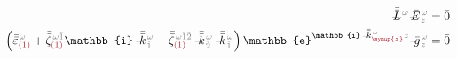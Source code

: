 \begin{subequations}
\begin{align}
	\xint{\mathcolor{gray}{-}}{32}{\bar{\bar{L}}}^{\;\! \mathcolor{gray}{\omega}} \xint{\mathcolor{gray}{-}}{295}{\bar{E}}^{\;\!\mathcolor{gray}{\omega}}_{\;\! \mathcolor{gray}{z}}
	&= \bar{0} \label{eq:nonlinear(2)-wave_wkrho-simplify6-L} \\
	\left( \bar{\bar{\varepsilon}}^{\;\! \mathcolor{gray}{\omega}}_{\textcolor{Maroon}{(1)}} + \bar{\bar{\zeta}}^{\;\! \mathcolor{gray}{\omega} \mathcolor{gray}{\check{1}}}_{\textcolor{Maroon}{(1)}} \mathbb{i} \xint{\begin{smallmatrix} ~ \\ {}^{}_{\mathcolor{gray}{-}} \\ ~ \end{smallmatrix}}{15}{\bar{\bar{k}}}_{\;\! \mathcolor{gray}{\check{1}}}^{\;\! \mathcolor{gray}{\omega}} - \bar{\bar{\zeta}}^{\;\! \mathcolor{gray}{\omega} \mathcolor{gray}{\check{1} \check{2}}}_{\textcolor{Maroon}{(1)}} \xint{\begin{smallmatrix} ~ \\ {}^{}_{\mathcolor{gray}{-}} \\ ~ \end{smallmatrix}}{15}{\bar{\bar{k}}}_{\;\! \mathcolor{gray}{\check{2}}}^{\;\! \mathcolor{gray}{\omega}} \xint{\begin{smallmatrix} ~ \\ {}^{}_{\mathcolor{gray}{-}} \\ ~ \end{smallmatrix}}{15}{\bar{\bar{k}}}_{\;\! \mathcolor{gray}{\check{1}}}^{\;\! \mathcolor{gray}{\omega}} \right) \mathbb{e}^{\mathbb{i} \xint{\begin{smallmatrix} ~ \\ {}^{}_{\mathcolor{gray}{-}} \\ ~ \end{smallmatrix}}{15}{\bar{\bar{k}}}_{\textcolor{Maroon}{\symup{z}}}^{\;\! \mathcolor{gray}{\omega}} \mathcolor{gray}{z}} \xint{{}^{}_{\mathcolor{gray}{-}}}{10}{\bar{g}}^{\;\!\mathcolor{gray}{\omega}}_{\;\! \mathcolor{gray}{z}} &= \bar{0}  \label{eq:nonlinear(2)-wave_wkrho-simplify6-L2} \\

\end{align}
\end{subequations}
